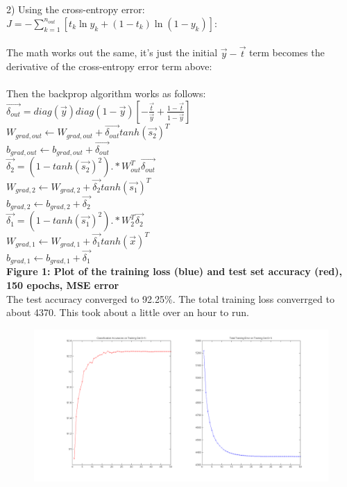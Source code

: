 \documentclass[11pt]{article}
\begin{document}
\\\\
2) Using the cross-entropy error: $J = - \sum_{k=1}^{n_{out}} [t_k \ln y_k + (1 - t_k) \ln (1 - y_k)] $:
\\\\
The math works out the same, it's just the initial $\vec{y} - \vec{t}$ term becomes the derivative of the cross-entropy error term above:
\\\\
Then the backprop algorithm works as follows: \\
$ \vec{\delta_{out}} = diag(\vec{y}) diag(1 - \vec{y}) [ - \frac{\vec{t}}{\vec{y}} + \frac{ 1 - \vec{t}}{1 - \vec{y}} ]$ \\
$ W_{grad, out} \leftarrow W_{grad,out} + \vec{\delta_{out}} tanh(\vec{s_2})^T $ \\
$ b_{grad, out} \leftarrow b_{grad,out} + \vec{\delta_{out}}  $ \\
$ \vec{\delta_2} = (1 - tanh(\vec{s_2})^2) .* W_{out}^T \vec{\delta_{out}} $ \\
$ W_{grad, 2} \leftarrow W_{grad,2} + \vec{\delta_{2}} tanh(\vec{s_1})^T $ \\
$ b_{grad, 2} \leftarrow b_{grad,2} + \vec{\delta_{2}} $ \\
$ \vec{\delta_1} = (1 - tanh(\vec{s_1})^2) .* W_{2}^T \vec{\delta_{2}} $ \\
$ W_{grad, 1} \leftarrow W_{grad,1} + \vec{\delta_{1}} tanh(\vec{x})^T $ \\
$ b_{grad, 1} \leftarrow b_{grad,1} + \vec{\delta_{1}} $ \\
\newpage
\textbf{Figure 1: Plot of the training loss (blue) and test set accuracy (red), 150 epochs, MSE error}  \\
The test accuracy converged to 92.25\%. The total training loss converrged to about 4370. This took about a little over an hour to run.
\begin{figure}[ht!]
\centering
\includegraphics[width=150mm]{plots/finalp1mse.png}
\label{overflow}
\end{figure}
\end{document}
